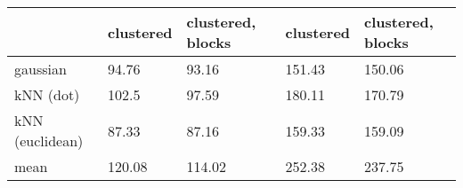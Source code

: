 \begin{tabular}{lllll}
\toprule
                & clustered & clustered, blocks & clustered & clustered, blocks\\
\midrule
gaussian        & 94.76     & 93.16             & 151.43    & 150.06\\
kNN (dot)       & 102.5     & 97.59             & 180.11    & 170.79\\
kNN (euclidean) & 87.33     & 87.16             & 159.33    & 159.09\\
mean            & 120.08    & 114.02            & 252.38    & 237.75\\
\bottomrule
\end{tabular}

